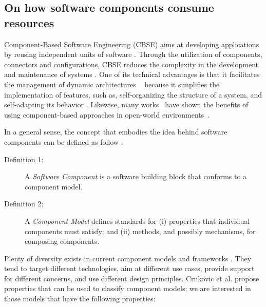 \subsection{On how software components consume resources} \label{sec:components-oriented-resource-awareness}

Component-Based Software Engineering (CBSE) aims at developing applications by reusing independent units of software \cite{cbse-conference, Crnkovic2011}.
Through the utilization of components, connectors and configurations, CBSE reduces the complexity in the development and maintenance of systems \cite{xadl,Medvidovic:2000,VanOmmering-et-al-00}.
One of its technical advantages is that it facilitates the management of dynamic architectures
~\cite{DBLP:journals/ase/NittoGMPP08, Johnson:2015:CSM:2735960.2735979}
because it simplifies the implementation of features, such as, self-organizing the structure of a system, and self-adapting its behavior
\cite{PanzicaLaManna:2012:LDU:2304736.2304764, Johnson:2015:CSM:2735960.2735979,Zhang:2009:MVD:1509239.1509262}.
Likewise, many works~\cite{cbse-conference} have shown the benefits of using component-based approaches in open-world environments~\cite{baresi2006toward, Caporuscio:2010:AIA:1985522.1985547, Perez-Palacin:2010:PAO:1712605.1712614}.

In a general sense, the concept that embodies the idea behind software components can be defined as follow
\cite{Crnkovic2011}:

\begin{description}
\item[Definition 1:] A \textit{Software Component} is a software building block that conforms to a component model. 
\item[Definition 2:] A \textit{Component Model} defines standards for (i) properties that individual components must satisfy; and (ii) methods, and possibly mechanisms, for composing components.
\end{description}

Plenty of diversity exists in current component models and frameworks \cite{Heineman2001, SZYPERSKI2002, Crnkovic2011}.
They tend to target different technologies, aim at different use cases, provide support for different concerns, and use different design principles.
Crnkovic et al. \cite{Crnkovic2011} propose properties that can be used to classify component models; we are interested in those models that have the following properties:

